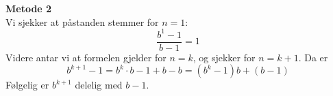 \textbf{Metode 2} \\
Vi sjekker at påstanden stemmer for $n=1$:
\[ \frac{b^1-1}{b-1}=1 \]
Videre antar vi at formelen gjelder for $n=k$, og sjekker for $n=k+1$. Da er
\[ b^{k+1}-1=b^k\cdot b-1+b-b=(b^k-1)b+(b-1)\]
Følgelig er $b^{k+1}$ delelig med $b-1$.


